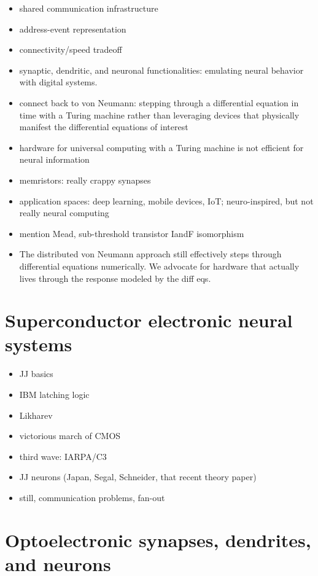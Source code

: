 \documentclass[twocolumn]{article}
\begin{document}
\begin{itemize}
\item shared communication infrastructure
\item address-event representation
\item connectivity/speed tradeoff
\item synaptic, dendritic, and neuronal functionalities: emulating neural behavior with digital systems.
\item connect back to von Neumann: stepping through a differential equation in time with a Turing machine rather than leveraging devices that physically manifest the differential equations of interest
\item hardware for universal computing with a Turing machine is not efficient for neural information
\item memristors: really crappy synapses
\item application spaces: deep learning, mobile devices, IoT; neuro-inspired, but not really neural computing
\item mention Mead, sub-threshold transistor IandF isomorphism
\item The distributed von Neumann approach still effectively steps through differential equations numerically. We advocate for hardware that actually lives through the response modeled by the diff eqs. 
\end{itemize}

\section{\label{sec:superconductors}Superconductor electronic neural systems}

\begin{itemize}
\item JJ basics
\item IBM latching logic
\item Likharev
\item victorious march of CMOS
\item third wave: IARPA/C3
\item JJ neurons (Japan, Segal, Schneider, that recent theory paper)
\item still, communication problems, fan-out
\end{itemize}

\section{\label{sec:optoelectronicNeurons}Optoelectronic synapses, dendrites, and neurons}
\end{document}
